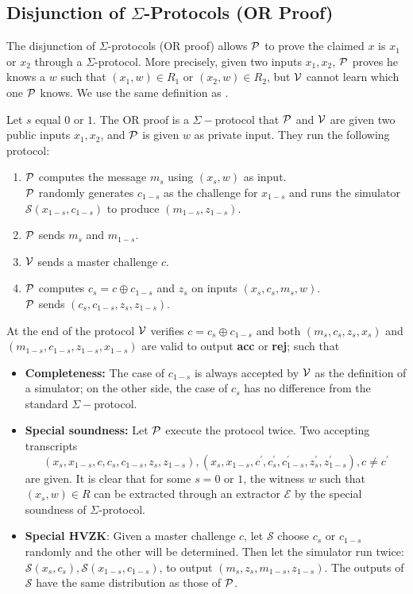 \subsection{Disjunction of $\Sigma$-Protocols (OR Proof)}
The disjunction of $\Sigma$-protocols (OR proof) allows $\mathcal{P}$ to prove the claimed $x$ is $x_1$ or $x_2$ through a $\Sigma$-protocol. More precisely, given two inputs $x_1,x_2$, $\mathcal{P}$ proves he knows a $w$ such that $(x_1,w)\in{R_1}$ or $(x_2,w)\in{R_2}$, but $\mathcal{V}$ cannot learn which one $\mathcal{P}$ knows. We use the same definition as \cite{damgard10}.
\begin{definition}[OR Proof]
Let $s$ equal $0$ or $1$. The OR proof is a $\Sigma-$protocol that $\mathcal{P}$ and $\mathcal{V}$ are given two public inputs $x_1,x_2$, and $\mathcal{P}$ is given $w$ as private input. They run the following protocol:
\begin{enumerate}
    \item $\mathcal{P}$ computes the message $m_s$ using $(x_s,w)$ as input. \\
    $\mathcal{P}$ randomly generates $c_{1-s}$ as the challenge for $x_{1-s}$ and runs the simulator $\mathcal{S}(x_{1-s},c_{1-s})$ to produce $(m_{1-s},z_{1-s})$.
    \item $\mathcal{P}$ sends $m_s$ and $m_{1-s}$.
    \item $\mathcal{V}$ sends a master challenge $c$.
    \item $\mathcal{P}$ computes $c_s=c\oplus{c_{1-s}}$ and $z_s$ on inputs $(x_s,c_s,m_s,w)$. \\
    $\mathcal{P}$ sends $(c_s,c_{1-s},z_s,z_{1-s})$.
\end{enumerate}
At the end of the protocol $\mathcal{V}$ verifies $c=c_s\oplus{c_{1-s}}$ and both $(m_s,c_s,z_s,x_s)$ and $(m_{1-s},c_{1-s},z_{1-s},x_{1-s})$ are valid to output \textbf{acc} or \textbf{rej}; such that
\begin{itemize}
    \item \textbf{Completeness:} The case of $c_{1-s}$ is always accepted by $\mathcal{V}$ as the definition of a simulator; on the other side, the case of $c_s$ has no difference from the standard $\Sigma-$protocol.
    \item \textbf{Special soundness:} Let $\mathcal{P}$ execute the protocol twice. Two accepting transcripts
    \[ (x_s,x_{1-s},c,c_s,c_{1-s},z_s,z_{1-s}),(x_s,x_{1-s},c^\prime,c_s^\prime,c_{1-s}^\prime,z_s^\prime,z_{1-s}^\prime),c\ne{c^\prime} \] 
    are given. It is clear that for some $s=0$ or $1$, the witness $w$ such that $(x_s,w)\in{R}$ can be extracted through an extractor $\mathcal{E}$ by the special soundness of $\Sigma$-protocol.
    \item \textbf{Special HVZK}: Given a master challenge $c$, let $\mathcal{S}$ choose $c_s$ or $c_{1-s}$ randomly and the other will be determined. Then let the simulator run twice: $\mathcal{S}(x_s,c_s),\mathcal{S}(x_{1-s},c_{1-s})$, to output $(m_s,z_s,m_{1-s},z_{1-s})$. The outputs of $\mathcal{S}$ have the same distribution as those of $\mathcal{P}$.
\end{itemize}
\end{definition}

